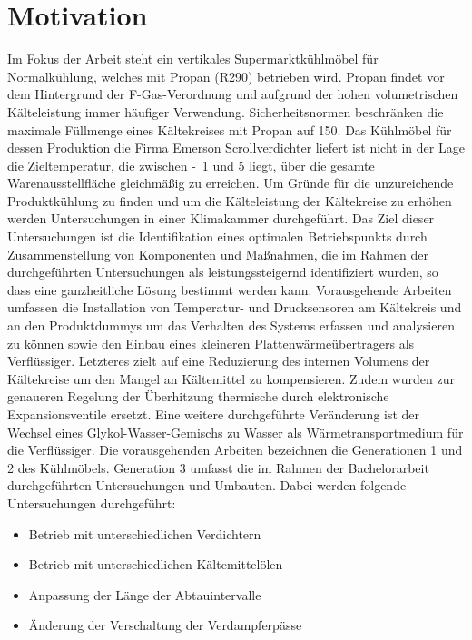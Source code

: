 \chapter{Motivation}
\label{cha:Motivation}

Im Fokus der Arbeit steht ein vertikales Supermarktkühlmöbel für Normalkühlung, welches mit Propan (R290) betrieben wird. Propan findet vor dem Hintergrund der F-Gas-Verordnung und aufgrund der hohen volumetrischen Kälteleistung immer häufiger Verwendung\cite{EUParlamentRat.2006}\cite{Huber.2016}. Sicherheitsnormen beschränken die maximale Füllmenge eines Kältekreises mit Propan auf \unit{150}{\gram}\cite{DINDeutschesInstitutfurNormunge.V..2014b}. Das Kühlmöbel für dessen Produktion die Firma Emerson Scrollverdichter liefert ist nicht in der Lage die Zieltemperatur, die zwischen \unit{-1}{\celsius} und \unit{5}{\celsius} liegt, über die gesamte Warenausstellfläche gleichmäßig zu erreichen. Um Gründe für die unzureichende Produktkühlung zu finden und um die Kälteleistung der Kältekreise zu erhöhen werden Untersuchungen in einer Klimakammer durchgeführt. Das Ziel dieser Untersuchungen ist die Identifikation eines optimalen Betriebspunkts durch Zusammenstellung von Komponenten und Maßnahmen, die im Rahmen der durchgeführten Untersuchungen als leistungssteigernd identifiziert wurden, so dass eine ganzheitliche Lösung bestimmt werden kann. 
Vorausgehende Arbeiten umfassen die Installation von Temperatur- und Drucksensoren am Kältekreis und an den Produktdummys um das Verhalten des Systems erfassen und analysieren zu können sowie den Einbau eines kleineren Plattenwärmeübertragers als Verflüssiger. Letzteres zielt auf eine Reduzierung des internen Volumens der Kältekreise um den Mangel an Kältemittel zu kompensieren. Zudem wurden zur genaueren Regelung der Überhitzung thermische durch elektronische Expansionsventile ersetzt. Eine weitere durchgeführte Veränderung ist der Wechsel eines Glykol-Wasser-Gemischs zu Wasser als Wärmetransportmedium für die Verflüssiger.
Die vorausgehenden Arbeiten bezeichnen die Generationen 1 und 2 des Kühlmöbels.
Generation 3 umfasst die im Rahmen der Bachelorarbeit durchgeführten Untersuchungen und Umbauten.
Dabei werden folgende Untersuchungen durchgeführt:

\begin{itemize} 
\item Betrieb mit unterschiedlichen Verdichtern 
\item Betrieb mit unterschiedlichen Kältemittelölen
\item Anpassung der Länge der Abtauintervalle
\item Änderung der Verschaltung der Verdampferpässe
\end{itemize}


